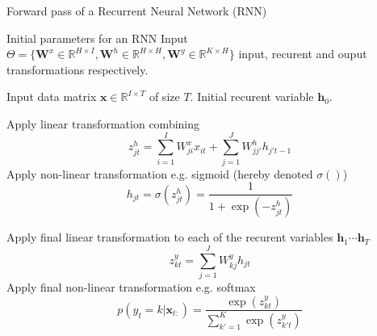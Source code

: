 \begin{algorithm}[th!]
\label{algo:rnnforward}
   \caption{Forward pass of a Recurrent Neural Network (RNN)}
\begin{algorithmic}[1]

    Initial parameters for an RNN Input
$\Theta=\{\mathbf{W}^x \in \mathbb{R}^{H \times I}, \mathbf{W}^h \in \mathbb{R}^{H \times H}, \mathbf{W}^y \in \mathbb{R}^{K \times H} \}$ input, recurent and ouput transformations respectively.

    Input data matrix $\mathbf{x} \in \mathbb{R}^{I \times T}$ of size $T$. Initial recurent variable $\mathbf{h}_0$. 

     \STATE Apply linear transformation combining
        $$z_{jt}^h = \sum_{i=1}^{I} W_{ji}^x x_{it} + \sum_{j=1}^{J} W_{jj'}^h h_{j't-1}$$
     \STATE Apply non-linear transformation e.g. sigmoid (hereby denoted $\sigma()$)
     $$h_{jt} = \sigma(z_{jt}^h)  = \frac{1}{1+\exp(-z_{jt}^h)}$$

	\ENDFOR

\STATE Apply final linear transformation to each of the recurent variables $\mathbf{h}_1 \cdots \mathbf{h}_T$ 
   $$z_{kt}^y = \sum_{j=1}^{J} W_{kj}^y h_{jt}$$
\STATE Apply final non-linear transformation e.g. softmax 
$$p(y_t=k|\mathbf{x}_{t:}) = \frac{\exp(z_{kt}^y)}{\sum_{k'=1}^{K} \exp(z_{k't}^y)}$$

\end{algorithmic}
\end{algorithm}

